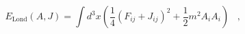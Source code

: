 \begin{equation}
E_{\mathrm{Lond}}(A,J)=\int d^{3}x\left( \frac{1}{4}\left(
F_{ij}+J_{ij}\right) ^{2}+\frac{1}{2}m^{2}A_{i}A_{i}\right) \;\;\;,\;\;\;\;
\label{l}
\end{equation}

